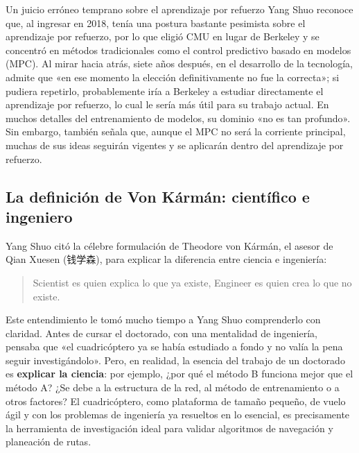 \documentclass[a4paper]{article}
\begin{document}
\begin{warningbox}{Un juicio erróneo temprano sobre el aprendizaje por refuerzo}
Yang Shuo reconoce que, al ingresar en 2018, tenía una postura bastante pesimista sobre el aprendizaje por refuerzo, por lo que eligió CMU en lugar de Berkeley y se concentró en métodos tradicionales como el control predictivo basado en modelos (MPC). Al mirar hacia atrás, siete años después, en el desarrollo de la tecnología, admite que «en ese momento la elección definitivamente no fue la correcta»; si pudiera repetirlo, probablemente iría a Berkeley a estudiar directamente el aprendizaje por refuerzo, lo cual le sería más útil para su trabajo actual. En muchos detalles del entrenamiento de modelos, su dominio «no es tan profundo». Sin embargo, también señala que, aunque el MPC no será la corriente principal, muchas de sus ideas seguirán vigentes y se aplicarán dentro del aprendizaje por refuerzo.
\end{warningbox}

\subsection{La definición de Von Kármán: científico e ingeniero}

Yang Shuo citó la célebre formulación de Theodore von K\'arm\'an, el asesor de Qian Xuesen (钱学森), para explicar la diferencia entre ciencia e ingeniería:

\begin{quote}
Scientist es quien explica lo que ya existe, Engineer es quien crea lo que no existe.
\end{quote}

Este entendimiento le tomó mucho tiempo a Yang Shuo comprenderlo con claridad. Antes de cursar el doctorado, con una mentalidad de ingeniería, pensaba que «el cuadricóptero ya se había estudiado a fondo y no valía la pena seguir investigándolo». Pero, en realidad, la esencia del trabajo de un doctorado es \textbf{explicar la ciencia}: por ejemplo, ¿por qué el método B funciona mejor que el método A? ¿Se debe a la estructura de la red, al método de entrenamiento o a otros factores? El cuadricóptero, como plataforma de tamaño pequeño, de vuelo ágil y con los problemas de ingeniería ya resueltos en lo esencial, es precisamente la herramienta de investigación ideal para validar algoritmos de navegación y planeación de rutas.
\end{document}
